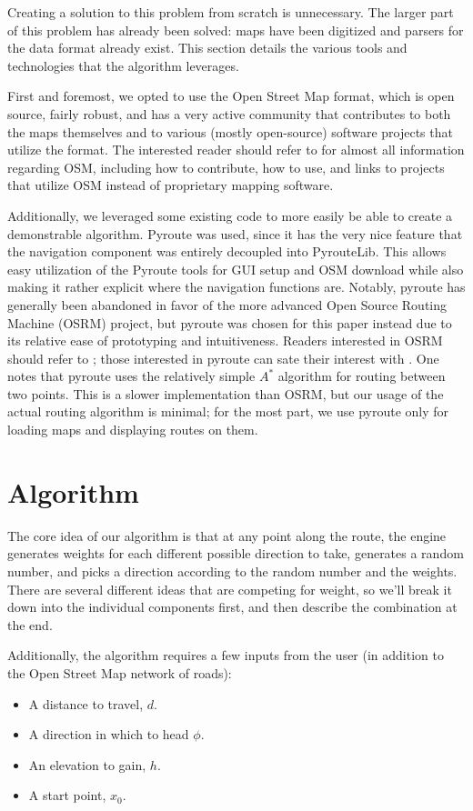 \documentclass[twocolumn,12pt]{article}
\begin{document}
Creating a solution to this problem from scratch is unnecessary. The larger part
of this problem has already been solved: maps have been digitized and
parsers for the data format already exist. This section details the various
tools and technologies that the algorithm leverages.

First and foremost, we opted to use the Open Street Map format, which is open
source, fairly robust, and has a very active community that contributes to both
the maps themselves and to various (mostly open-source) software projects that
utilize the format. The interested reader should refer to  for
almost all information regarding OSM, including how to contribute, how to use,
and links to projects that utilize OSM instead of proprietary mapping software.

Additionally, we leveraged some existing code to more easily be able to create
a demonstrable algorithm. Pyroute was used, since it has the very nice feature
that the navigation component was entirely decoupled into PyrouteLib. This
allows easy utilization of the Pyroute tools for GUI setup and OSM download
while also making it rather explicit where the navigation functions are.
Notably, pyroute has generally been abandoned in favor of the more advanced
Open Source Routing Machine (OSRM) project, but pyroute was chosen for this
paper instead due to its relative ease of prototyping and intuitiveness. Readers
interested in OSRM should refer to ; those interested in
pyroute can sate their interest with . One notes that
pyroute uses the relatively simple $A^*$ algorithm for routing between two
points. This is a slower implementation than OSRM, but our usage of the actual
routing algorithm is minimal; for the most part, we use pyroute only for loading
maps and displaying routes on them.

\section{Algorithm}

The core idea of our algorithm
is that at any point along the route, the engine generates weights for each
different possible direction to take, generates a random number, and picks a
direction according to the random number and the weights. There are several
different ideas that are competing for weight, so we'll break it down into the
individual components first, and then describe the combination at the end.

Additionally, the algorithm requires a few inputs from the user (in addition
to the Open Street Map network of roads):
\begin{itemize}
\item A distance to travel, $d$.
\item A direction in which to head $\phi$.
\item An elevation to gain, $h$.
\item A start point, $x_0$.
\end{itemize}
\end{document}
